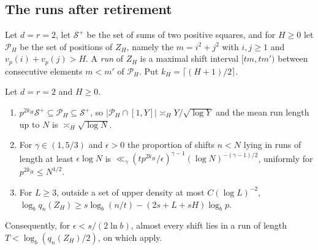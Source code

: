 \documentclass[11pt]{article}
\begin{document}
\subsection{The runs after retirement}

Let $d=r=2$, let $\mathcal S^+$ be the set of sums of two positive squares, and for $H\ge0$ let $\mathcal P_H$ be
the set of positions of $Z_H$, namely the $m=i^2+j^2$ with $i,j\ge1$ and $v_p(i)+v_p(j)>H$. A \emph{run} of $Z_H$
is a maximal shift interval $[tm,tm')$ between consecutive elements $m<m'$ of $\mathcal P_H$. Put
$k_H=\lceil(H+1)/2\rceil$.

\begin{theorem}\label{thm:runs}
Let $d=r=2$ and $H\ge0$.
\begin{enumerate}[label=\textup{(\roman*)},nosep]
\item $p^{2k_H}\mathcal S^+\subseteq\mathcal P_H\subseteq\mathcal S^+$, so $|\mathcal P_H\cap[1,Y]|\asymp_HY/\sqrt{\log Y}$ and the
mean run length up to $N$ is $\asymp_H\sqrt{\log N}$.
\item For $\gamma\in(1,5/3)$ and $\epsilon>0$ the proportion of shifts $n<N$ lying in runs of length at least
$\epsilon\log N$ is $\ll_\gamma(tp^{2k_H}/\epsilon)^{\gamma-1}(\log N)^{-(\gamma-1)/2}$, uniformly for
$p^{2k_H}\le N^{1/2}$.
\item For $L\ge3$, outside a set of upper density at most $C(\log L)^{-2}$,
$\log_bq_n(Z_H)\ge s\log_b(n/t)-(2s+L+sH)\log_bp$.
\end{enumerate}
Consequently, for $\epsilon<s/(2\ln b)$, almost every shift lies in a run of length $T<\log_b(q_n(Z_H)/2)$, on
which  apply.
\end{theorem}
\end{document}
